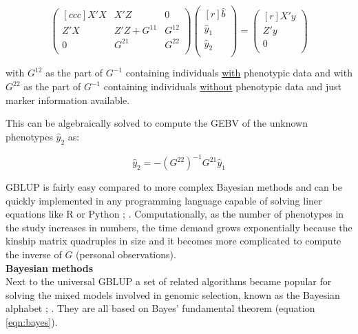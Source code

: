 \begin{equation}
 \begin{pmatrix}[ccc]
  X'X & X'Z & 0 \\ 
  Z'X & Z'Z + G^{11} & G^{12} \\ 
  0 & G^{21} & G^{22} \\ 
 \end{pmatrix}
 \begin{pmatrix}[r]
  \hat{b} \\ 
  \hat{y}_1 \\ 
  \hat{y}_2 \\ 
 \end{pmatrix}
 =
 \begin{pmatrix}[r]
  X'y \\ 
  Z'y \\ 
  0 \\ 
 \end{pmatrix}
 \label{eqn:pBLUP}
\end{equation}

with $G^{12}$ as the part of $G^{-1}$ containing individuals \underline{with} phenotypic data and with
$G^{22}$ as the part of $G^{-1}$ containing individuals \underline{without} phenotypic data and just
marker information available.

This can be algebraically solved to compute the GEBV of the unknown phenotypes $\hat{y}_2$  as:

\begin{equation}
\hat{y}_2 = -\left( G^{22}\right)^{-1}G^{21}\hat{y}_1
\label{eqn:gpred}
\end{equation}

GBLUP is fairly easy compared to more complex Bayesian methods and can be quickly implemented in any
programming language capable of solving liner equations like R or Python \cite{CRAN};
\cite{van1995python}. Computationally, as the number of phenotypes in the study increases in numbers,
the time demand grows exponentially because the kinship matrix quadruples in size and
it becomes more complicated to compute the inverse of $G$ (personal observations). \\

\noindent
\textbf{Bayesian methods} \\ 

Next to the universal GBLUP a set of related algorithms became popular for solving the mixed models
involved in genomic selection, known as the Bayesian alphabet \cite{gianola2009};
\cite{gianola2013}. They are all based on Bayes' fundamental theorem (equation \ref{eqn:bayes}).

